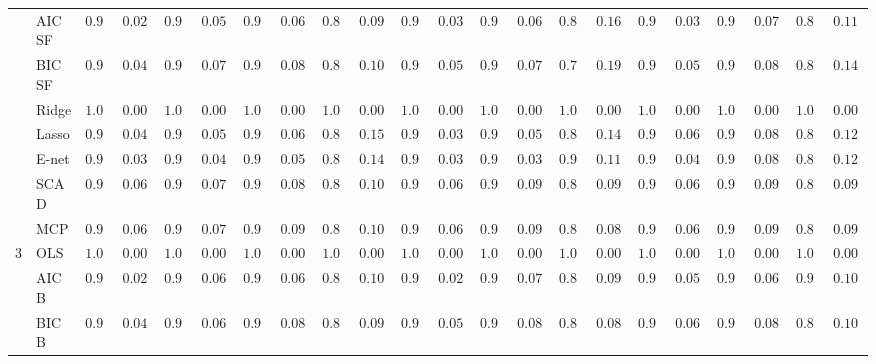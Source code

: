 \begin{tabular}{ll|ll|llllll|llllll|llllll}
 & AIC SF  & $0.998$ & $0.0200$ & $0.986$ & $0.0513$ & $0.974$ & $0.0676$ & $0.886$ & $0.0995$ & $0.992$ & $0.0394$ & $0.980$ & $0.0603$ & $0.828$ & $0.1609$ & $0.992$ & $0.0394$ & $0.970$ & $0.0718$ & $0.870$ & $0.1185$ \\
 & BIC SF  & $0.990$ & $0.0438$ & $0.970$ & $0.0718$ & $0.950$ & $0.0870$ & $0.844$ & $0.1008$ & $0.986$ & $0.0513$ & $0.962$ & $0.0789$ & $0.728$ & $0.1980$ & $0.986$ & $0.0513$ & $0.950$ & $0.0870$ & $0.816$ & $0.1496$ \\
 & Ridge  & $1.000$ & $0.0000$ & $1.000$ & $0.0000$ & $1.000$ & $0.0000$ & $1.000$ & $0.0000$ & $1.000$ & $0.0000$ & $1.000$ & $0.0000$ & $1.000$ & $0.0000$ & $1.000$ & $0.0000$ & $1.000$ & $0.0000$ & $1.000$ & $0.0000$ \\
 & Lasso  & $0.990$ & $0.0438$ & $0.984$ & $0.0545$ & $0.974$ & $0.0676$ & $0.834$ & $0.1506$ & $0.992$ & $0.0394$ & $0.984$ & $0.0545$ & $0.872$ & $0.1408$ & $0.980$ & $0.0603$ & $0.952$ & $0.0858$ & $0.838$ & $0.1229$ \\
 & E-net  & $0.992$ & $0.0394$ & $0.988$ & $0.0477$ & $0.984$ & $0.0545$ & $0.854$ & $0.1417$ & $0.994$ & $0.0343$ & $0.992$ & $0.0394$ & $0.904$ & $0.1154$ & $0.988$ & $0.0477$ & $0.954$ & $0.0846$ & $0.844$ & $0.1225$ \\
 & SCAD  & $0.976$ & $0.0653$ & $0.970$ & $0.0718$ & $0.946$ & $0.0892$ & $0.846$ & $0.1019$ & $0.978$ & $0.0629$ & $0.942$ & $0.0912$ & $0.836$ & $0.0916$ & $0.976$ & $0.0653$ & $0.944$ & $0.0903$ & $0.856$ & $0.0903$ \\
 & MCP  & $0.972$ & $0.0697$ & $0.968$ & $0.0737$ & $0.936$ & $0.0938$ & $0.844$ & $0.1085$ & $0.976$ & $0.0653$ & $0.938$ & $0.0930$ & $0.832$ & $0.0886$ & $0.972$ & $0.0697$ & $0.942$ & $0.0912$ & $0.850$ & $0.0916$ \\\hline
3 & OLS  & $1.000$ & $0.0000$ & $1.000$ & $0.0000$ & $1.000$ & $0.0000$ & $1.000$ & $0.0000$ & $1.000$ & $0.0000$ & $1.000$ & $0.0000$ & $1.000$ & $0.0000$ & $1.000$ & $0.0000$ & $1.000$ & $0.0000$ & $1.000$ & $0.0000$ \\
 & AIC B  & $0.998$ & $0.0200$ & $0.980$ & $0.0603$ & $0.978$ & $0.0629$ & $0.898$ & $0.1005$ & $0.996$ & $0.0281$ & $0.970$ & $0.0718$ & $0.866$ & $0.0945$ & $0.986$ & $0.0513$ & $0.978$ & $0.0629$ & $0.910$ & $0.1040$ \\
 & BIC B  & $0.990$ & $0.0438$ & $0.972$ & $0.0697$ & $0.960$ & $0.0804$ & $0.860$ & $0.0921$ & $0.986$ & $0.0513$ & $0.948$ & $0.0882$ & $0.842$ & $0.0867$ & $0.978$ & $0.0629$ & $0.952$ & $0.0858$ & $0.872$ & $0.1006$ \\

\end{tabular}
